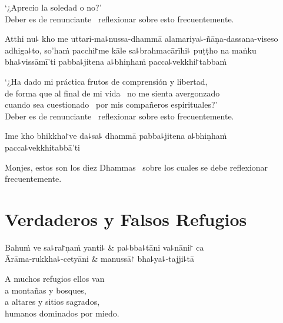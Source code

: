 \begin{english}
  ‘¿Aprecio la soledad o no?’ \pause\\
  Deber es de renunciante \pause\ reflexionar sobre esto frecuentemente.
\end{english}

Atthi nu꜕ kho me uttari-ma꜕nussa-dhammā alamariya꜕-ñāṇa-dassana-viseso adhiga꜕to, so'haṁ pacchi꜓me kāle sa꜕brahmacārīhi꜕ puṭṭho na maṅku bha꜕vissāmī'ti pabba꜕jitena a꜕bhiṇhaṁ pacca꜕vekkhi꜓tabbaṁ

\begin{english}
  ‘¿Ha dado mi práctica frutos de comprensión y libertad, \pause\\ de forma que
  al final de mi vida \pause\ no me sienta avergonzado \pause\\
  cuando sea cuestionado \pause\ por mis compañeros espirituales?’ \pause\\
  Deber es de renunciante \pause\ reflexionar sobre esto frecuentemente.
\end{english}

Ime kho bhikkha꜓ve da꜕sa꜕ dhammā pabba꜕jitena a꜕bhiṇhaṁ pacca꜕vekkhitabbā'ti

\begin{english}
  Monjes, estos son los diez Dhammas \pause\ sobre los cuales se debe reflexionar frecuentemente.
\end{english}

\chapter{Verdaderos y Falsos Refugios}


\begin{leader}
\end{leader}

\begin{twochants}
  Bahuṁ ve sa꜕ra꜓ṇaṁ yanti꜕ & pa꜕bba꜕tāni va꜕nāni꜓ ca \\
  Ārāma-rukkha꜕-cetyāni & manussā꜓ bha꜕ya꜕-tajji꜕tā \\
\end{twochants}

\begin{english}
  A muchos refugios ellos van\\
  a montañas y bosques,\\
  a altares y sitios sagrados,\\
  humanos dominados por miedo.
\end{english}

